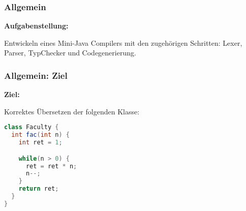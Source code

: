 \begin{frame}
	\frametitle{Allgemein}
	
\textbf{Aufgabenstellung:}

Entwickeln eines Mini-Java Compilers mit den zugehörigen Schritten: Lexer, Parser, TypChecker und Codegenerierung.
\end{frame}

\begin{frame}[fragile]
\frametitle{Allgemein: Ziel}

\textbf{Ziel:}

Korrektes Übersetzen der folgenden Klasse:

\begin{lstlisting}[language=Java]
class Faculty {
  int fac(int n) {
    int ret = 1;

    while(n > 0) {
      ret = ret * n;
      n--;
    }
    return ret;
  }
}
\end{lstlisting}	
\end{frame}

